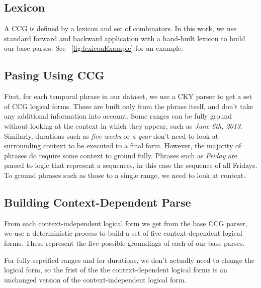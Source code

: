 \subsection{Lexicon}

A CCG is defined by a lexicon and set of combinators. In this work, we use standard forward and backward application with a hand-built lexicon to build our base parses. See ~\ref{fig:lexiconExample} for an example.




\subsection{Pasing Using CCG}
First, for each temporal phrase in our dataset, we use a CKY parser to get a set of CCG logical forms. These are built only from the phrase itself, and don't take any additional information into account. Some ranges can be fully ground without looking at the context in which they appear, such as \emph{June 6th, 2013}. Similarly, durations such as \emph{five weeks} or \emph{a year} don't need to look at surrounding context to be executed to a final form. However, the majority of phrases do require some context to ground fully. Phrases such as \emph{Friday} are parsed to logic that represent a sequences, in this case the sequence of all Fridays. To ground phrases such as those to a single range, we need to look at context.
\subsection{Building Context-Dependent Parse}


From each context-independent logical form we get from the base CCG parser, we use a deterministic process to build a set of five context-dependent logical forms. These represent the five possible groundings of each of our base parses. 

For fully-sepcified ranges and for durations, we don't actually need to change the logical form, so the frist of the the context-dependent logical forms is an unchanged version of the context-independent logical form. 

